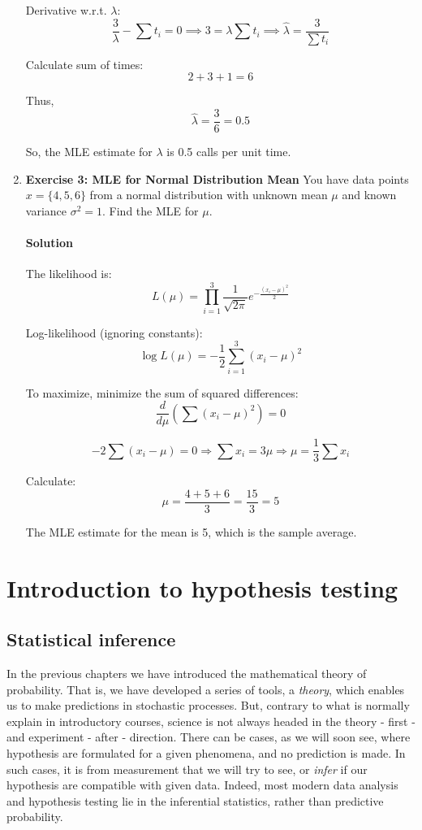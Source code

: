 \documentclass{book}
\begin{document}
\begin{enumerate}
	Derivative w.r.t. $\lambda$:
	\[
	\frac{3}{\lambda} - \sum t_i = 0 \implies 3 = \lambda \sum t_i \implies \hat{\lambda} = \frac{3}{\sum t_i}
	\]

	Calculate sum of times:
	\[
	2 + 3 + 1 = 6
	\]

	Thus,
	\[
	\hat{\lambda} = \frac{3}{6} = 0.5
	\]

	So, the MLE estimate for $\lambda$ is 0.5 calls per unit time.

	\item \textbf{Exercise 3: MLE for Normal Distribution Mean}
	You have data points $x = \{4, 5, 6\}$ from a normal distribution with unknown mean $\mu$ and known variance $\sigma^2 = 1$. Find the MLE for $\mu$.

	\subsubsection*{Solution}
	The likelihood is:
	\[
	L(\mu) = \prod_{i=1}^3 \frac{1}{\sqrt{2\pi}} e^{-\frac{(x_i - \mu)^2}{2}}
	\]

	Log-likelihood (ignoring constants):
	\[
	\log L(\mu) = -\frac{1}{2} \sum_{i=1}^3 (x_i - \mu)^2
	\]

	To maximize, minimize the sum of squared differences:
	\[
	\frac{d}{d\mu} \left( \sum (x_i - \mu)^2 \right) = 0
	\]

	\[
	-2 \sum (x_i - \mu) = 0 \Rightarrow \sum x_i = 3 \mu \Rightarrow \mu = \frac{1}{3} \sum x_i
	\]

	Calculate:
	\[
	\mu = \frac{4 + 5 + 6}{3} = \frac{15}{3} = 5
	\]

	The MLE estimate for the mean is 5, which is the sample average.

\end{enumerate}



\chapter{Introduction to hypothesis testing}

\section{Statistical inference}
In the previous chapters we have introduced the mathematical theory of probability. That is, we have developed a series of tools, a \textit{theory}, which enables us to make predictions in stochastic processes. But, contrary to what is normally explain in introductory courses, science is not always headed in the theory - first - and experiment - after - direction. There can be cases, as we will soon see, where hypothesis are formulated for a given phenomena, and no prediction is made. In such cases, it is from measurement that we will try to see, or \textit{infer} if our hypothesis are compatible with given data. Indeed, most modern data analysis and hypothesis testing lie in the inferential statistics, rather than predictive probability.
\end{document}

